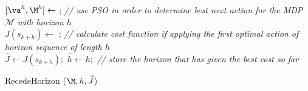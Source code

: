 \begin{algorithm}[b]
    
    $[\va^{h},\M^{h}] \leftarrow$ ; \textit{// use 
    PSO in 
    order to determine best next action for the MDP $\mathcal{M}$ with horizon $h$\\}
    ${J}(s_{k+h})\leftarrow$ 
    ;
    \textit{// calculate cost function if applying the first optimal action of horizon sequence of length $h$}\\
    {
   		$\widehat{J}\leftarrow J(s_{k+h});$
        $\widehat{h}\leftarrow h;$ \textit{// store the horizon that has given the best cost so far}
    }
    
	\caption{RecedeHorizon ($\M,h,\widehat{J}$)}
	\label{alg:rhp}
\end{algorithm}
\setlength{\floatsep}{0.1cm}